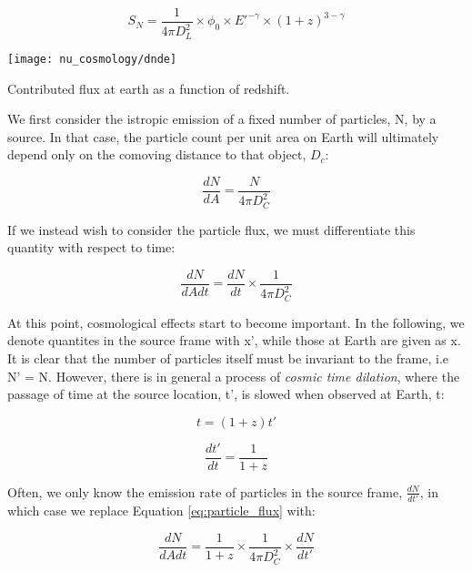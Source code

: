 \begin{equation}
S_{N} = \frac{1}{4 \pi D_{L}^{2}} \times \phi_{0} \times E'^{-\gamma}\times (1+z) ^{3-\gamma}
\end{equation}

\begin{marginfigure}
	\centering \texttt{[image: nu\_cosmology/dnde]}
	\caption{Contributed flux at earth as a function of redshift.}
	\label{fig:dnde}
\end{marginfigure}

We first consider the istropic emission of a fixed number of particles, N, by a source. In that case, the particle count per unit area on Earth will ultimately depend only on the comoving distance to that object, $D_{c}$:

\begin{equation}
\frac{dN}{dA} = \frac{N}{4 \pi D_{C}^{2}}
\label{eq:particle_per_area}
\end{equation}

If we instead wish to consider the particle flux, we must differentiate this quantity with respect to time:

\begin{equation}
\frac{dN}{dAdt} = \frac{dN}{dt} \times \frac{1}{4 \pi D_{C}^{2}}
\label{eq:particle_flux}
\end{equation}

At this point, cosmological effects start to become important. In the following, we denote quantites in the source frame with x', while those at Earth are given as x. It is clear that the number of particles itself must be invariant to the frame, i.e N' = N. However, there is in general a process of \emph{cosmic time dilation}, where the passage of time at the source location, t', is slowed when observed at Earth, t:

\begin{equation}
t = (1+z)t'
\label{eq:t}
\end{equation}

\begin{equation}
\frac{dt'}{dt} = \frac{1}{1+z}
\label{eq:dt}
\end{equation}

Often, we only know the emission rate of particles in the source frame, $\frac{dN}{dt'}$, in which case we replace Equation \ref{eq:particle_flux} with:

\begin{equation}
\frac{dN}{dAdt} = \frac{1}{1+z} \times \frac{1}{4 \pi D_{C}^{2}} \times \frac{dN}{dt'}
\end{equation}

